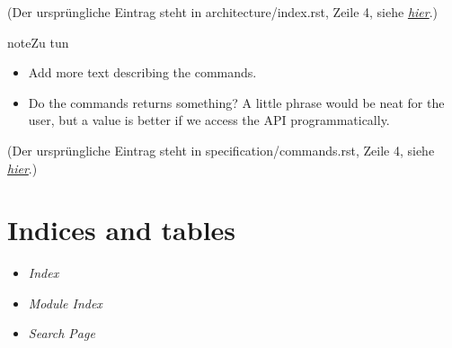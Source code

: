 \documentclass[letterpaper,10pt,ngerman]{manual}
\begin{document}
(Der ursprüngliche Eintrag steht in architecture/index.rst, Zeile 4, siehe \hyperlink{todo-18}{\emph{hier}}.)

\begin{notice}{note}{Zu tun}
\begin{itemize}
\item {} 
Add more text describing the commands.

\item {} 
Do the commands returns something? A little phrase would be neat for the
user, but a value is better if we access the API programmatically.

\end{itemize}
\end{notice}

(Der ursprüngliche Eintrag steht in specification/commands.rst, Zeile 4, siehe \hyperlink{todo-19}{\emph{hier}}.)


\chapter{Indices and tables}
\begin{itemize}
\item {} 
\emph{Index}

\item {} 
\emph{Module Index}

\item {} 
\emph{Search Page}

\end{itemize}


\renewcommand{\indexname}{Modulindex}
\printmodindex
\renewcommand{\indexname}{Stichwortverzeichnis}
\printindex
\end{document}
